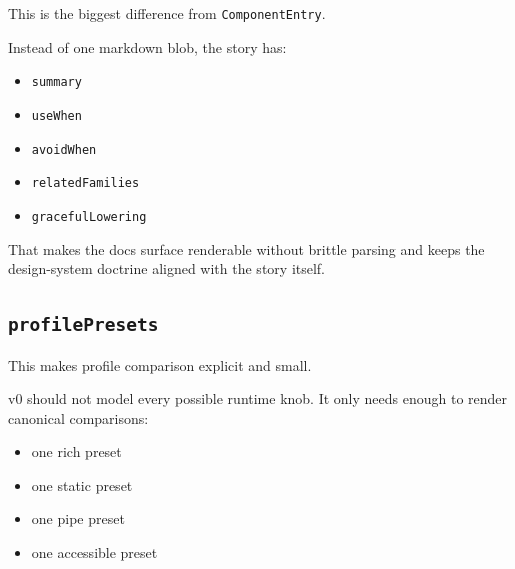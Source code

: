 This is the biggest difference from \texttt{C\allowbreak{}o\allowbreak{}m\allowbreak{}p\allowbreak{}o\allowbreak{}n\allowbreak{}e\allowbreak{}n\allowbreak{}t\allowbreak{}E\allowbreak{}n\allowbreak{}t\allowbreak{}r\allowbreak{}y}.

Instead of one markdown blob, the story has:

\begin{itemize}
\tightlist
\item
  \texttt{s\allowbreak{}u\allowbreak{}m\allowbreak{}m\allowbreak{}a\allowbreak{}r\allowbreak{}y}
\item
  \texttt{u\allowbreak{}s\allowbreak{}e\allowbreak{}W\allowbreak{}h\allowbreak{}e\allowbreak{}n}
\item
  \texttt{a\allowbreak{}v\allowbreak{}o\allowbreak{}i\allowbreak{}d\allowbreak{}W\allowbreak{}h\allowbreak{}e\allowbreak{}n}
\item
  \texttt{r\allowbreak{}e\allowbreak{}l\allowbreak{}a\allowbreak{}t\allowbreak{}e\allowbreak{}d\allowbreak{}F\allowbreak{}a\allowbreak{}m\allowbreak{}i\allowbreak{}l\allowbreak{}i\allowbreak{}e\allowbreak{}s}
\item
  \texttt{g\allowbreak{}r\allowbreak{}a\allowbreak{}c\allowbreak{}e\allowbreak{}f\allowbreak{}u\allowbreak{}l\allowbreak{}L\allowbreak{}o\allowbreak{}w\allowbreak{}e\allowbreak{}r\allowbreak{}i\allowbreak{}n\allowbreak{}g}
\end{itemize}

That makes the docs surface renderable without brittle parsing and keeps the design-system doctrine aligned with the story itself.

\subsection{\texorpdfstring{\texttt{p\allowbreak{}r\allowbreak{}o\allowbreak{}f\allowbreak{}i\allowbreak{}l\allowbreak{}e\allowbreak{}P\allowbreak{}r\allowbreak{}e\allowbreak{}s\allowbreak{}e\allowbreak{}t\allowbreak{}s}}{}}\label{record-039-profilepresets}

This makes profile comparison explicit and small.

v0 should not model every possible runtime knob. It only needs enough to render canonical comparisons:

\begin{itemize}
\tightlist
\item
  one rich preset
\item
  one static preset
\item
  one pipe preset
\item
  one accessible preset
\end{itemize}

